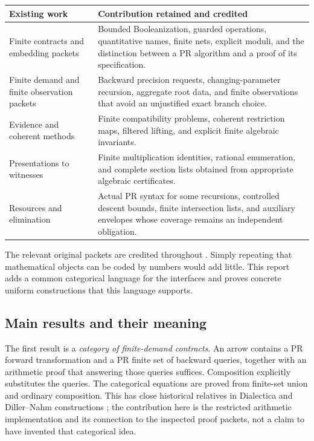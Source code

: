 \begin{longtable}{@{}P{.24\linewidth}P{.69\linewidth}@{}}
\toprule
Existing work & Contribution retained and credited\\
\midrule\endhead
Finite contracts and embedding packets & Bounded Booleanization, guarded
operations, quantitative names, finite nets, explicit moduli, and the distinction
between a PR algorithm and a proof of its specification.\\
Finite demand and finite observation packets & Backward precision requests,
changing-parameter recursion, aggregate root data, and finite observations that
avoid an unjustified exact branch choice.\\
Evidence and coherent methods & Finite compatibility problems, coherent
restriction maps, filtered lifting, and explicit finite algebraic invariants.\\
Presentations to witnesses & Finite multiplication identities, rational
enumeration, and complete section lists obtained from appropriate algebraic
certificates.\\
Resources and elimination & Actual PR syntax for some recursions, controlled
descent bounds, finite intersection lists, and auxiliary envelopes whose coverage
remains an independent obligation.\\
\bottomrule
\end{longtable}

The relevant original packets are credited throughout
\cite{repo-demand,repo-observation,repo-evidence,repo-coherent,repo-witnesses,repo-resources}.
Simply repeating that mathematical objects can be coded by numbers would add
little. This report adds a common categorical language for the interfaces and
proves concrete uniform constructions that this language supports.

\subsection{Main results and their meaning}

The first result is a \emph{category of finite-demand contracts}. An arrow
contains a PR forward transformation and a PR finite set of backward queries,
together with an arithmetic proof that answering those queries suffices.
Composition explicitly substitutes the queries. The categorical equations are
proved from finite-set union and ordinary composition. This has close historical
relatives in Dialectica and Diller--Nahm constructions
\cite{depaiva1991,depaiva2015}; the contribution here is the restricted arithmetic
implementation and its connection to the inspected proof packets, not a claim
to have invented that categorical idea.

